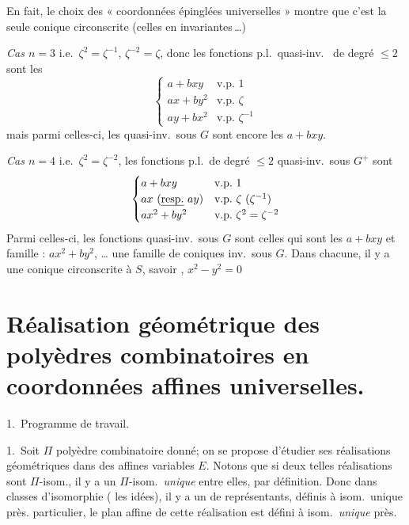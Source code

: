 \documentclass[11pt,a4paper]{article}
\begin{document}
En fait, le choix des « coordonnées épinglées universelles » montre que c'est la seule conique circonscrite (celles en    invariantes\,…)

\emph{Cas $n = 3$} i.e.\ $\zeta^{2} = \zeta^{-1}$, $\zeta^{-2} = \zeta$, donc les fonctions p.l.\ quasi-inv.\  de degré $\leq 2$ sont les
\[
\begin{cases}
a + bxy & \text{v.p.\ } 1 \\
ax + by^{2} & \text{v.p.\ } \zeta \\
ay + bx^{2} & \text{v.p.\ } \zeta^{-1}
\end{cases}
\]
mais parmi celles-ci, les quasi-inv.\ sous $G$ sont encore les $a + bxy$.

\emph{Cas $n = 4$} i.e.\ $\zeta^{2} = \zeta^{-2}$, les fonctions p.l.\ de degré $\leq 2$ quasi-inv.\ sous $G^{+}$  sont
\[
\begin{cases}
a + bxy & \text{v.p.\ } 1 \\
ax \ (\text{\uncertain{resp.}}\ ay) & \text{v.p.\ } \zeta\ (\zeta^{-1}) \\
ax^{2} + by^{2} & \text{v.p.\ } \zeta^{2} = \zeta^{-2}
\end{cases}
\]
Parmi celles-ci, les fonctions quasi-inv.\ sous $G$ sont celles qui sont les $a + bxy$ et     famille : $ax^{2} + by^{2}$, \ldots{} une  famille de coniques inv.\ sous $G$. Dans chacune, il y a  une conique circonscrite à $S$, savoir ,  $x^{2} - y^{2} = 0$

\section{Réalisation géométrique des polyèdres  combinatoires en coordonnées affines universelles.}

1.\ Programme de travail.

\struck{\ill{}} 1.\ Soit $\Pi$ polyèdre combinatoire donné; on se propose d'étudier ses réalisations géométriques  dans des   affines variables $E$. Notons que si deux telles réalisations sont $\Pi$-isom., il y a un $\Pi$-isom.\ \emph{unique} entre elles, par définition. Donc dans  classes d'isomorphie ( les idées), il y a un   de  représentants, définis à isom.\ unique près.  particulier, le plan affine  de cette réalisation  est défini à isom.\ \emph{unique} près.
\end{document}
